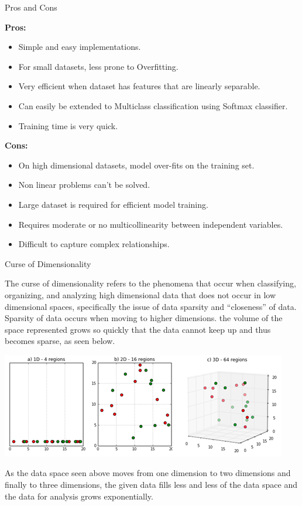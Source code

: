 \documentclass{beamer}
\newcommand\myheading[1]{%
  \par\bigskip
  {\Large\bfseries#1}\par\smallskip}
\begin{document}
\begin{frame}{Pros and Cons}
\begin{flushleft}
\myheading{Pros:}
\begin{itemize}
	\item Simple and easy implementations.
	\item For small datasets, less prone to Overfitting.
	\item Very efficient when dataset has features that are linearly separable.
	\item Can easily be extended to Multiclass classification using Softmax classifier.
	\item Training time is very quick.
\end{itemize}
\myheading{Cons:}
\begin{itemize}
	\item On high dimensional datasets, model over-fits on the training set.
	\item Non linear problems can't be solved.
	\item Large dataset is required for efficient model training.
	\item Requires moderate or no multicollinearity between independent variables.
	\item Difficult to capture complex relationships.
\end{itemize}
\end{flushleft}
\end{frame}

\begin{frame}{Curse of Dimensionality}
	\begin{flushleft}
		The curse of dimensionality refers to the phenomena that occur when classifying, organizing, and analyzing high dimensional data that does not occur in low dimensional spaces, specifically the issue of data sparsity and “closeness” of data.\\
		Sparsity of data occurs when moving to higher dimensions. the volume of the space represented grows so quickly that the data cannot keep up and thus becomes sparse, as seen below.\\

	\end{flushleft}
	\includegraphics[scale=0.4]{cod}\\
\begin{flushleft}
	As the data space seen above moves from one dimension to two dimensions and finally to three dimensions, the given data fills less and less of the data space and the data for analysis grows exponentially.
\end{flushleft}
\end{frame}
\end{document}
